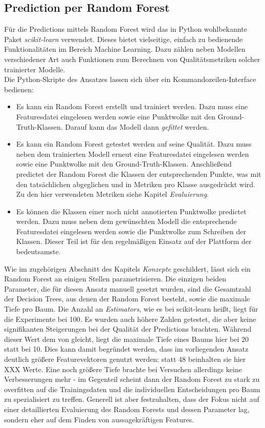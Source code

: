 \subsection{Prediction per Random Forest} 

Für die Predictions mittels Random Forest wird das in Python wohlbekannte Paket \textit{scikit-learn} verwendet. Dieses bietet vielseitige, einfach zu bedienende Funktionalitäten im Bereich Machine Learning. Dazu zählen neben Modellen verschiedener Art auch Funktionen zum Berechnen von Qualitätsmetriken solcher trainierter Modelle. \\
Die Python-Skripte des Ansatzes lassen sich über ein Kommandozeilen-Interface bedienen:
\begin{itemize}
    \item Es kann ein Random Forest erstellt und trainiert werden. Dazu muss eine Featuresdatei eingelesen werden sowie eine Punktwolke mit den Ground-Truth-Klassen. Darauf kann das Modell dann \textit{gefittet} werden.
    \item Es kann ein Random Forest getestet werden auf seine Qualität. Dazu muss neben dem trainierten Modell erneut eine Featuresdatei eingelesen werden sowie eine Punktwolke mit den Ground-Truth-Klassen. Anschließend predictet der Random Forest die Klassen der entsprechenden Punkte, was mit den tatsächlichen abgeglichen und in Metriken pro Klasse ausgedrückt wird. Zu den hier verwendeten Metriken siehe Kapitel \textit{Evaluierung}.
    \item Es können die Klassen einer noch nicht annotierten Punktwolke predictet werden. Dazu muss neben dem gewünschten Modell die entsprechende Featuresdatei eingelesen werden sowie die Punktwolke zum Schreiben der Klassen. Dieser Teil ist für den regelmäßigen Einsatz auf der Plattform der bedeutsamste.
\end{itemize}
Wie im zugehörigen Abschnitt des Kapitels \textit{Konzepte} geschildert, lässt sich ein Random Forest an einigen Stellen parametrisieren. Die einzigen beiden Parameter, die für diesen Ansatz manuell gesetzt wurden, sind die Gesamtzahl der Decision Trees, aus denen der Random Forest besteht, sowie die maximale Tiefe pro Baum. Die Anzahl an \textit{Estimators}, wie es bei scikit-learn heißt, liegt für die Experimente bei 100. Es wurden auch höhere Zahlen getestet, die aber keine signifikanten Steigerungen bei der Qualität der Predictions brachten. Während dieser Wert dem von \cite{Zhiqiang.etal-2019} gleicht, liegt die maximale Tiefe eines Baums hier bei 20 statt bei 10. Dies kann damit begründet werden, dass im vorliegenden Ansatz deutlich größere Featurevektoren genutzt werden: statt 48 beinhalten sie hier XXX Werte. Eine noch größere Tiefe brachte bei Versuchen allerdings keine Verbesserungen mehr - im Gegenteil scheint dann der Random Forest zu stark zu overfitten auf die Trainingsdaten und die individuellen Entscheidungen pro Baum zu spezialisiert zu treffen. Generell ist aber festzuhalten, dass der Fokus nicht auf einer detaillierten Evaluierung des Random Forests und dessen Parameter lag, sondern eher auf dem Finden von aussagekräftigen Features.
